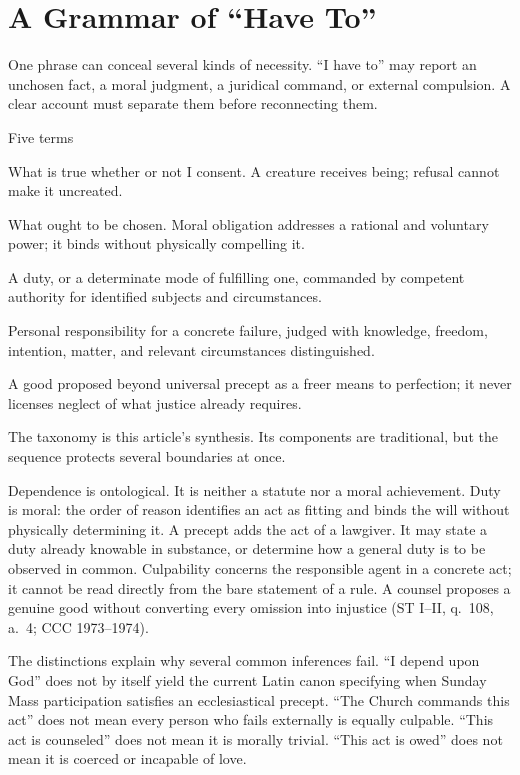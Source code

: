 \section{A Grammar of ``Have To''}

One phrase can conceal several kinds of necessity. ``I have to'' may report an unchosen fact, a moral judgment, a juridical command, or external compulsion. A clear account must separate them before reconnecting them.

\begin{studybox}{Five terms}
\begin{description}[leftmargin=1.45em,style=nextline,itemsep=0.25em,topsep=0.2em]
\item[Dependence] What is true whether or not I consent. A creature receives being; refusal cannot make it uncreated.
\item[Duty] What ought to be chosen. Moral obligation addresses a rational and voluntary power; it binds without physically compelling it.
\item[Precept] A duty, or a determinate mode of fulfilling one, commanded by competent authority for identified subjects and circumstances.
\item[Culpability] Personal responsibility for a concrete failure, judged with knowledge, freedom, intention, matter, and relevant circumstances distinguished.
\item[Counsel] A good proposed beyond universal precept as a freer means to perfection; it never licenses neglect of what justice already requires.
\end{description}
\end{studybox}

The taxonomy is this article's synthesis. Its components are traditional, but the sequence protects several boundaries at once.

Dependence is ontological. It is neither a statute nor a moral achievement. Duty is moral: the order of reason identifies an act as fitting and binds the will without physically determining it. A precept adds the act of a lawgiver. It may state a duty already knowable in substance, or determine how a general duty is to be observed in common. Culpability concerns the responsible agent in a concrete act; it cannot be read directly from the bare statement of a rule. A counsel proposes a genuine good without converting every omission into injustice (ST I--II, q.~108, a.~4; CCC 1973--1974).

The distinctions explain why several common inferences fail. ``I depend upon God'' does not by itself yield the current Latin canon specifying when Sunday Mass participation satisfies an ecclesiastical precept. ``The Church commands this act'' does not mean every person who fails externally is equally culpable. ``This act is counseled'' does not mean it is morally trivial. ``This act is owed'' does not mean it is coerced or incapable of love.

